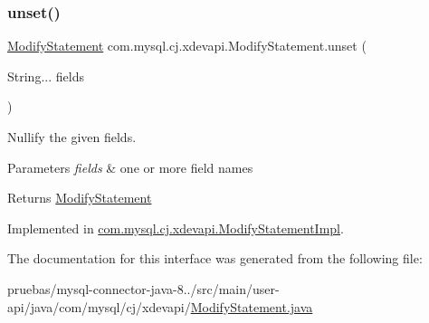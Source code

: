 \subsubsection{\texorpdfstring{unset()}{unset()}}
{\footnotesize\ttfamily \mbox{\hyperlink{interfacecom_1_1mysql_1_1cj_1_1xdevapi_1_1_modify_statement}{Modify\+Statement}} com.\+mysql.\+cj.\+xdevapi.\+Modify\+Statement.\+unset (\begin{DoxyParamCaption}\item[{String...}]{fields }\end{DoxyParamCaption})}

Nullify the given fields.


\begin{DoxyParams}{Parameters}
{\em fields} & one or more field names \\
\hline
\end{DoxyParams}
\begin{DoxyReturn}{Returns}
\mbox{\hyperlink{interfacecom_1_1mysql_1_1cj_1_1xdevapi_1_1_modify_statement}{Modify\+Statement}} 
\end{DoxyReturn}


Implemented in \mbox{\hyperlink{classcom_1_1mysql_1_1cj_1_1xdevapi_1_1_modify_statement_impl_ae2479079b83bdbefcabdf68380467a6d}{com.\+mysql.\+cj.\+xdevapi.\+Modify\+Statement\+Impl}}.



The documentation for this interface was generated from the following file\+:\begin{DoxyCompactItemize}
\item 
pruebas/mysql-\/connector-\/java-\/8../src/main/user-\/api/java/com/mysql/cj/xdevapi/\mbox{\hyperlink{_modify_statement_8java}{Modify\+Statement.\+java}}\end{DoxyCompactItemize}
